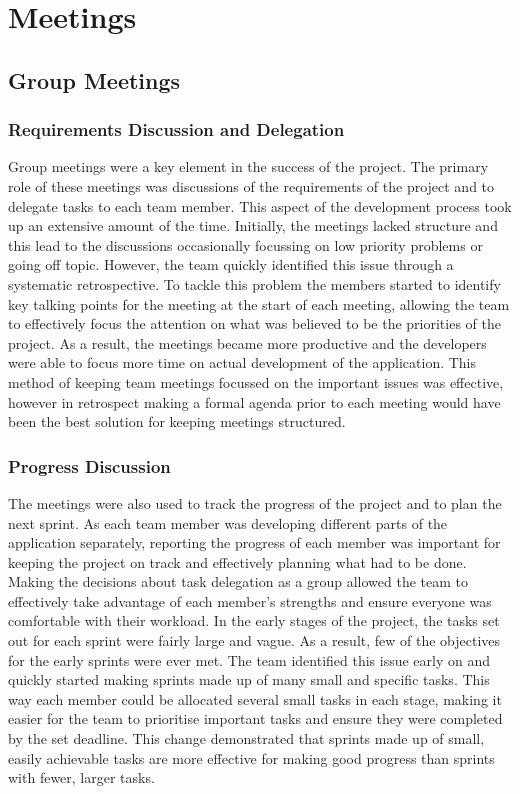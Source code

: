 \documentclass{l3proj}
\begin{document}
\section{Meetings}
\label{sec:meetings}

\subsection{Group Meetings}
\subsubsection{Requirements Discussion and Delegation}
Group meetings were a key element in the success of the project. The primary role of these meetings was discussions of the requirements of the project and to delegate tasks to each team member. This aspect of the development process took up an extensive amount of the time. Initially, the meetings lacked structure and this lead to the discussions occasionally focussing on low priority problems or going off topic. However, the team quickly identified this issue through a systematic retrospective. To tackle this problem the members started to identify key talking points for the meeting at the start of each meeting, allowing the team to effectively focus the attention on what was believed to be the priorities of the project. As a result, the meetings became more productive and the developers were able to focus more time on actual development of the application. This method of keeping team meetings focussed on the important issues was effective, however in retrospect making a formal agenda prior to each meeting would have been the best solution for keeping meetings structured.

\subsubsection{Progress Discussion}
The meetings were also used to track the progress of the project and to plan the next sprint. As each team member was developing different parts of the application separately, reporting the progress of each member was important for keeping the project on track and effectively planning what had to be done. Making the decisions about task delegation as a group allowed the team to effectively take advantage of each member's strengths and ensure everyone was comfortable with their workload. In the early stages of the project, the tasks set out for each sprint were fairly large and vague. As a result, few of the objectives for the early sprints were ever met. The team identified this issue early on and quickly started making sprints made up of many small and specific tasks. This way each member could be allocated several small tasks in each stage, making it easier for the team to prioritise important tasks and ensure they were completed by the set deadline. This change demonstrated that sprints made up of small, easily achievable tasks are more effective for making good progress than sprints with fewer, larger tasks.
\end{document}
